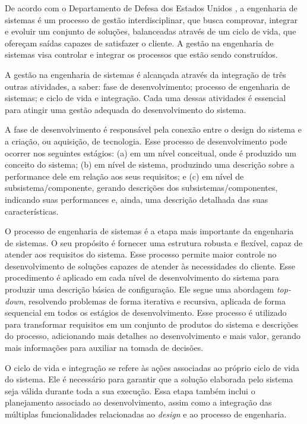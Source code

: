     De acordo com o Departamento de Defesa dos Estados Unidos \cite{dod2001systems}, a engenharia de sistemas é um processo de gestão interdisciplinar, que busca comprovar, integrar e evoluir um conjunto de soluções, balanceadas através de um ciclo de vida, que ofereçam saídas capazes de satisfazer o cliente. A gestão na engenharia de sistemas visa controlar e integrar os processos que estão sendo construídos. 
    
        
    A gestão na engenharia de sistemas é alcançada através da integração de três outras atividades, a saber: fase de desenvolvimento; processo de engenharia de sistemas; e ciclo de vida e integração. Cada uma dessas atividades é essencial para atingir uma gestão adequada do desenvolvimento do sistema.
    
    A fase de desenvolvimento é responsável pela conexão entre o design do sistema e a criação, ou aquisição, de tecnologia. Esse processo de desenvolvimento pode ocorrer nos seguintes estágios: (a) em um nível conceitual, onde é produzido um conceito do sistema; (b) em nível de sistema, produzindo uma descrição sobre a performance dele em relação aos seus requisitos; e (c) em nível de subsistema/componente, gerando descrições dos subsistemas/componentes, indicando suas performances e, ainda, uma descrição detalhada das suas características.
    
    O processo de engenharia de sistemas é a etapa mais importante da engenharia de sistemas. O seu propósito é fornecer uma estrutura robusta e flexível, capaz de atender aos requisitos do sistema. Esse processo permite maior controle no desenvolvimento de soluções capazes de atender às necessidades do cliente. Esse procedimento é aplicado em cada nível de desenvolvimento do sistema para produzir uma descrição básica de configuração. Ele segue uma abordagem \textit{top-down}, resolvendo problemas de forma iterativa e recursiva, aplicada de forma sequencial em todos os estágios de desenvolvimento. Esse processo é utilizado para transformar requisitos em um conjunto de produtos do sistema e descrições do processo, adicionando mais detalhes ao desenvolvimento e mais valor, gerando mais informações para auxiliar na tomada de decisões.

    O ciclo de vida e integração se refere às ações associadas ao próprio ciclo de vida do sistema. Ele é necessário para garantir que a solução elaborada pelo sistema seja válida durante toda a sua execução. Essa etapa também inclui o planejamento associado ao desenvolvimento, assim como a integração das múltiplas funcionalidades relacionadas ao \textit{design} e ao processo de engenharia.

